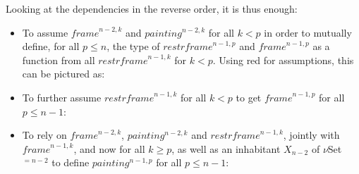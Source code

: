 \documentclass{article}
\newcommand{\myframe}{\mathit{frame}}
\newcommand{\painting}{\mathit{painting}}
\newcommand{\restrframe}{\mathit{restrframe}}
\begin{document}
Looking at the dependencies in the reverse order, it is thus enough:
\begin{itemize}
  \item To assume $\myframe^{n-2,k}$ and $\painting^{n-2,k}$ for all $k< p$
        in order to mutually define, for all $p\leq n$, the type of
        $\restrframe^{n-1,p}$ and $\myframe^{n-1,p}$ as a function from all
        $\restrframe^{n-1,k}$ for $k< p$. Using red for assumptions, this
        can be pictured as:
        \begin{center}
        \end{center}

  \item To further assume $\restrframe^{n-1,k}$ for all $k<p$ to get
        $\myframe^{n-1,p}$ for all $p\leq n-1$:
        \begin{center}
        \end{center}

  \item To rely on $\myframe^{n-2,k}$, $\painting^{n-2,k}$ and
        $\restrframe^{n-1,k}$, jointly with $\myframe^{n-1,k}$, and now for all
        $k \geq p$, as well as an inhabitant $X_{n-2}$ of $\nu$Set$^{=n-2}$
        to define $\painting^{n-1,p}$ for all $p \leq n-1$:
        \begin{center}
        \end{center}


\end{itemize}
\end{document}
